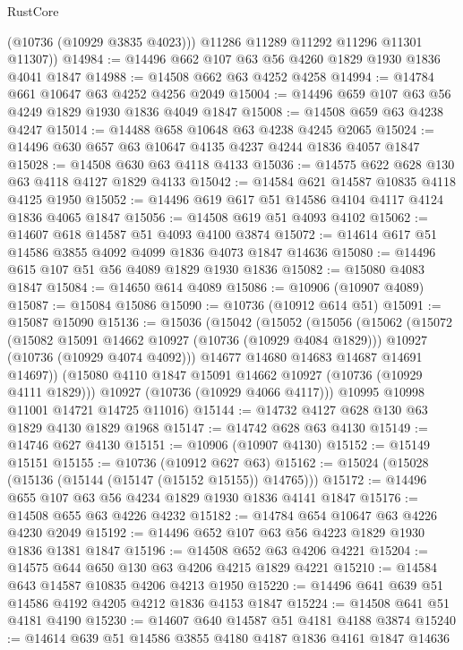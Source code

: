 \begin{lexlean}{RustCore}
\begin{coremodule}
          (@10736 (@10929 @3835 @4023)))
        @11286
        @11289
        @11292
        @11296
        @11301
        @11307))
@14984 := @14496 @662 @107 @63 @56 @4260 @1829 @1930 @1836 @4041 @1847
@14988 := @14508 @662 @63 @4252 @4258
@14994 := @14784 @661 @10647 @63 @4252 @4256 @2049
@15004 := @14496 @659 @107 @63 @56 @4249 @1829 @1930 @1836 @4049 @1847
@15008 := @14508 @659 @63 @4238 @4247
@15014 := @14488 @658 @10648 @63 @4238 @4245 @2065
@15024 := @14496 @630 @657 @63 @10647 @4135 @4237 @4244 @1836 @4057 @1847
@15028 := @14508 @630 @63 @4118 @4133
@15036 := @14575 @622 @628 @130 @63 @4118 @4127 @1829 @4133
@15042 := @14584 @621 @14587 @10835 @4118 @4125 @1950
@15052 := @14496 @619 @617 @51 @14586 @4104 @4117 @4124 @1836 @4065 @1847
@15056 := @14508 @619 @51 @4093 @4102
@15062 := @14607 @618 @14587 @51 @4093 @4100 @3874
@15072 := @14614 @617 @51 @14586 @3855 @4092 @4099 @1836 @4073 @1847 @14636
@15080 := @14496 @615 @107 @51 @56 @4089 @1829 @1930 @1836
@15082 := @15080 @4083 @1847
@15084 := @14650 @614 @4089
@15086 := @10906 (@10907 @4089)
@15087 := @15084 @15086
@15090 := @10736 (@10912 @614 @51)
@15091 := @15087 @15090
@15136 := @15036
    (@15042
      (@15052
        (@15056
          (@15062
            (@15072
              (@15082 @15091 @14662 @10927 (@10736 (@10929 @4084 @1829)))
              @10927
              (@10736 (@10929 @4074 @4092)))
            @14677
            @14680
            @14683
            @14687
            @14691
            @14697))
        (@15080 @4110 @1847 @15091 @14662 @10927 (@10736 (@10929 @4111 @1829)))
        @10927
        (@10736 (@10929 @4066 @4117)))
      @10995
      @10998
      @11001
      @14721
      @14725
      @11016)
@15144 := @14732 @4127 @628 @130 @63 @1829 @4130 @1829 @1968
@15147 := @14742 @628 @63 @4130
@15149 := @14746 @627 @4130
@15151 := @10906 (@10907 @4130)
@15152 := @15149 @15151
@15155 := @10736 (@10912 @627 @63)
@15162 := @15024 (@15028 (@15136 (@15144 (@15147 (@15152 @15155)) @14765)))
@15172 := @14496 @655 @107 @63 @56 @4234 @1829 @1930 @1836 @4141 @1847
@15176 := @14508 @655 @63 @4226 @4232
@15182 := @14784 @654 @10647 @63 @4226 @4230 @2049
@15192 := @14496 @652 @107 @63 @56 @4223 @1829 @1930 @1836 @1381 @1847
@15196 := @14508 @652 @63 @4206 @4221
@15204 := @14575 @644 @650 @130 @63 @4206 @4215 @1829 @4221
@15210 := @14584 @643 @14587 @10835 @4206 @4213 @1950
@15220 := @14496 @641 @639 @51 @14586 @4192 @4205 @4212 @1836 @4153 @1847
@15224 := @14508 @641 @51 @4181 @4190
@15230 := @14607 @640 @14587 @51 @4181 @4188 @3874
@15240 := @14614 @639 @51 @14586 @3855 @4180 @4187 @1836 @4161 @1847 @14636

\end{coremodule}
\end{lexlean}
